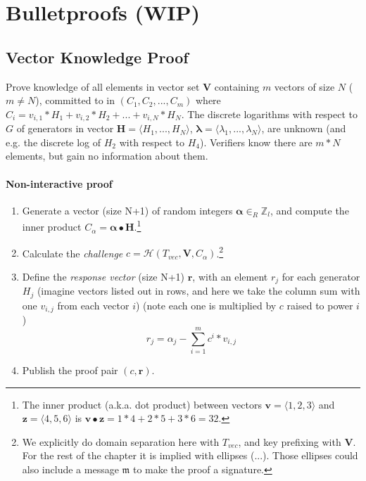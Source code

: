 \chapter{Bulletproofs (WIP)}
\label{chapter:bulletproofs}


\section{Vector Knowledge Proof}
\label{sec:vectorzkproof}

Prove knowledge of all elements in vector set $\boldsymbol{V}$ containing $m$ vectors of size $N$ ($m \neq N$), committed to in $(C_1, C_2,..., C_m)$ where $C_i = v_{i,1}*H_1 + v_{i,2}*H_2 + ... + v_{i,N}*H_N$. The discrete logarithms with respect to $G$ of generators in vector $\boldsymbol{H} = \langle H_1,..., H_N \rangle$, $\boldsymbol{\lambda} = \langle \lambda_1, ..., \lambda_N \rangle$, are unknown (and e.g. the discrete log of $H_2$ with respect to $H_4$). Verifiers know there are $m*N$ elements, but gain no information about them.

\subsubsection*{Non-interactive proof}

\begin{enumerate}
	\item Generate a vector (size N+1) of random integers \(\boldsymbol{\alpha} \in_R \mathbb{Z}_l\), and compute the inner product $C_{\alpha} = \boldsymbol{\alpha} \bullet \textbf{H}$.\footnote{The inner product (a.k.a. dot product) between vectors \(\boldsymbol{v} = \langle 1, 2, 3 \rangle\) and \(\boldsymbol{z} = \langle 4, 5, 6 \rangle\) is \(\boldsymbol{v} \bullet \boldsymbol{z} = 1*4 + 2*5 + 3*6 = 32\).}
	\item Calculate the {\em challenge} $c = \mathcal{H}(T_{vec},\boldsymbol{V},C_{\alpha})$.\footnote{We explicitly do domain separation here with $T_{vec}$, and key prefixing with $\boldsymbol{V}$. For the rest of the chapter it is implied with ellipses (...). Those ellipses could also include a message $\mathfrak{m}$ to make the proof a signature.}
	\item Define the {\em response vector} (size N+1) $\textbf{r}$, with an element $r_j$ for each generator $H_j$ (imagine vectors listed out in rows, and here we take the column sum with one $v_{i,j}$ from each vector $i$) (note each one is multiplied by $c$ raised to power $i$)
	\[r_j = \alpha_j - \sum^{m}_{i=1} c^i*v_{i,j}\]
	\item Publish the proof pair $(c, \boldsymbol{r})$.
\end{enumerate}


